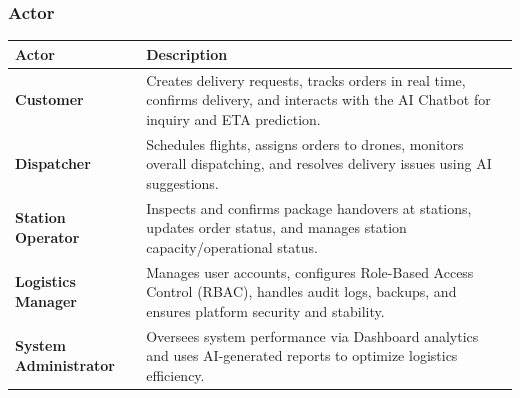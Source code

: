 \subsubsection{Actor}

\begin{longtable}{@{}p{3.5cm}p{10cm}@{}}
\toprule
\textbf{Actor} & \textbf{Description} \\
\midrule
\endhead
\textbf{Customer} & Creates delivery requests, tracks orders in real time, confirms delivery, and interacts with the AI Chatbot for inquiry and ETA prediction. \\
\textbf{Dispatcher} & Schedules flights, assigns orders to drones, monitors overall dispatching, and resolves delivery issues using AI suggestions. \\
\textbf{Station Operator} & Inspects and confirms package handovers at stations, updates order status, and manages station capacity/operational status. \\
\textbf{Logistics Manager} & Manages user accounts, configures Role-Based Access Control (RBAC), handles audit logs, backups, and ensures platform security and stability. \\
\textbf{System Administrator} & Oversees system performance via Dashboard analytics and uses AI-generated reports to optimize logistics efficiency. \\
\bottomrule
\end{longtable}
